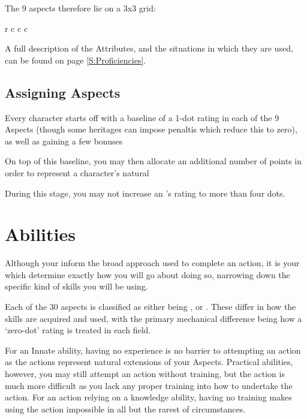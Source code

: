 The 9 aspects therefore lie on a 3x3 grid:

\begin{center}
	\begin{rndtable}{r c c c}
	\end{rndtable}
\end{center}

A full description of the Attributes, and the situations in which they are used, can be found on page \ref{S:Proficiencies}.

\subsection{Assigning Aspects}

Every character starts off with a baseline of a 1-dot rating in each of the 9 Aspects (though some  heritages can impose penaltis which reduce this to zero), as well as gaining a few bonuses 

On top of this baseline, you may then allocate an additional number of points in order to represent a character's natural 

During this stage, you may not increase an 's rating to more than four dots. 



\section{Abilities}

Although your  inform the broad approach used to complete an action, it is your  which determine exactly how you will go about doing so, narrowing down the specific kind of skills you will be using. 

Each of the 30 aspects is classified as either being ,  or . These differ in how the skills are acquired and used, with the primary mechanical difference being how a `zero-dot' rating is treated in each field. 

For an Innate ability, having no experience is no barrier to attempting an action as the actions represent natural extensions of your Aspects. Practical abilities, however, you may still attempt an action without training, but the action is much more difficult as you lack any proper training into how to undertake the action. For an action relying on a knowledge ability, having no training makes using the action impossible in all but the rarest of circumstances.

